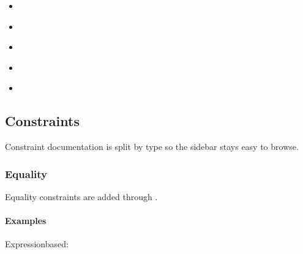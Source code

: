 \documentclass[letterpaper,10pt,english,openany,oneside]{sphinxmanual}
\begin{document}
\begin{itemize}
\item {} 
\sphinxAtStartPar
{\hyperref[\detokenize{api/package/object:nlpoptnet.api.NLPOptNet.cos}]{}}

\item {} 
\sphinxAtStartPar
{\hyperref[\detokenize{api/package/object:nlpoptnet.api.NLPOptNet.exp}]{}}

\item {} 
\sphinxAtStartPar
{\hyperref[\detokenize{api/package/object:nlpoptnet.api.NLPOptNet.log}]{}}

\item {} 
\sphinxAtStartPar
{\hyperref[\detokenize{api/package/object:nlpoptnet.api.NLPOptNet.sqrt}]{}}

\item {} 
\sphinxAtStartPar
{\hyperref[\detokenize{api/package/object:nlpoptnet.api.NLPOptNet.abs}]{}}

\end{itemize}

\sphinxstepscope


\subsection{Constraints}
\label{\detokenize{api/package/constraints/index:constraints}}\label{\detokenize{api/package/constraints/index::doc}}
\sphinxAtStartPar
Constraint documentation is split by type so the sidebar stays easy to browse.

\sphinxstepscope


\subsubsection{Equality}
\label{\detokenize{api/package/constraints/equality:equality}}\label{\detokenize{api/package/constraints/equality::doc}}
\sphinxAtStartPar
Equality constraints are added through .


\paragraph{Examples}
\label{\detokenize{api/package/constraints/equality:examples}}
\sphinxAtStartPar
Expression\sphinxhyphen{}based:
\end{document}
